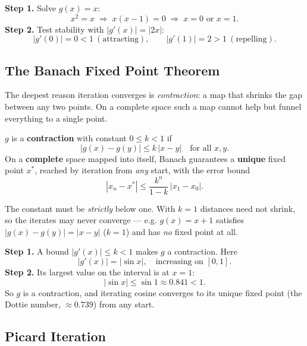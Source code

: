 \begin{examplebox}[Worked Example 3.4: Fixed points of $g(x)=x^{2}$]
\textbf{Step 1.} Solve $g(x)=x$:
\[ x^2 = x \;\Longrightarrow\; x(x-1)=0 \;\Longrightarrow\; x=0 \text{ or } x=1. \]
\textbf{Step 2.} Test stability with $|g'(x)| = |2x|$:
\[ |g'(0)| = 0 < 1 \ (\text{attracting}), \qquad |g'(1)| = 2 > 1 \ (\text{repelling}). \]
\end{examplebox}

\subsection{The Banach Fixed Point Theorem}

The deepest reason iteration converges is \emph{contraction}: a map that shrinks
the gap between any two points. On a complete space such a map cannot help but
funnel everything to a single point.

\begin{formulabox}
$g$ is a \textbf{contraction} with constant $0 \le k < 1$ if
\[ |g(x) - g(y)| \le k\,|x - y| \quad \text{for all } x,y. \]
On a \textbf{complete} space mapped into itself, Banach guarantees a
\textbf{unique} fixed point $x^*$, reached by iteration from \emph{any} start,
with the error bound
\[ |x_n - x^*| \le \frac{k^n}{1-k}\,|x_1 - x_0|. \]
\end{formulabox}

\begin{warningbox}[Common Pitfall: $k=1$ Is Not Enough]
The constant must be \emph{strictly} below one. With $k=1$ distances need not
shrink, so the iterates may never converge --- e.g. $g(x)=x+1$ satisfies
$|g(x)-g(y)|=|x-y|$ ($k=1$) and has \emph{no} fixed point at all.
\end{warningbox}

\begin{examplebox}[{Worked Example 3.5: $g(x)=\cos x$ is a contraction on $[0,1]$}]
\textbf{Step 1.} A bound $|g'(x)| \le k < 1$ makes $g$ a contraction. Here
\[ |g'(x)| = |\sin x|, \quad \text{increasing on } [0,1]. \]
\textbf{Step 2.} Its largest value on the interval is at $x=1$:
\[ |\sin x| \le \sin 1 \approx 0.841 < 1. \]
So $g$ is a contraction, and iterating cosine converges to its unique fixed
point (the Dottie number, $\approx 0.739$) from any start.
\end{examplebox}

\subsection{Picard Iteration}

